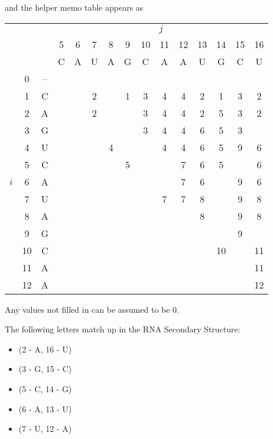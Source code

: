 \documentclass[11pt]{article}
\begin{document}
and the helper memo table appears as
\begin{center}
\begin{tabular}{ccc|*{12}{c|}}
   \multicolumn{3}{c}{}  & \multicolumn{12}{c}{$j$}  \\
   &    &   & 5 & 6 & 7 & 8 & 9 & 10& 11& 12& 13& 14& 15& 16\\
   &    &   & C & A & U & A & G & C & A & A & U & G & C & U \\\cline{2-15}
   &  0 & --&   &   &   &   &   &   &   &   &   &   &   &   \\\cline{2-15}
   &  1 & C &   &   & 2 &   & 1 & 3 & 4 & 4 & 2 & 1 & 3 & 2 \\\cline{2-15}
   &  2 & A &   &   & 2 &   &   & 3 & 4 & 4 & 2 & 5 & 3 & 2 \\\cline{2-15}
   &  3 & G &   &   &   &   &   & 3 & 4 & 4 & 6 & 5 & 3 &   \\\cline{2-15}
   &  4 & U &   &   &   & 4 &   &   & 4 & 4 & 6 & 5 & 9 & 6 \\\cline{2-15}
   &  5 & C &   &   &   &   & 5 &   &   & 7 & 6 & 5 &   & 6 \\\cline{2-15}
$i$&  6 & A &   &   &   &   &   &   &   & 7 & 6 &   & 9 & 6 \\\cline{2-15}
   &  7 & U &   &   &   &   &   &   & 7 & 7 & 8 &   & 9 & 8 \\\cline{2-15}
   &  8 & A &   &   &   &   &   &   &   &   & 8 &   & 9 & 8 \\\cline{2-15}
   &  9 & G &   &   &   &   &   &   &   &   &   &   & 9 &   \\\cline{2-15}
   & 10 & C &   &   &   &   &   &   &   &   &   & 10&   & 11\\\cline{2-15}
   & 11 & A &   &   &   &   &   &   &   &   &   &   &   & 11\\\cline{2-15}
   & 12 & A &   &   &   &   &   &   &   &   &   &   &   & 12\\\cline{2-15}
\end{tabular}
\end{center}

Any values not filled in can be assumed to be 0.

\clearpage

The following letters match up in the RNA Secondary Structure:
\begin{itemize}
   \item (2 - A, 16 - U)
   \item (3 - G, 15 - C)
   \item (5 - C, 14 - G)
   \item (6 - A, 13 - U)
   \item (7 - U, 12 - A)
\end{itemize}
\end{document}
